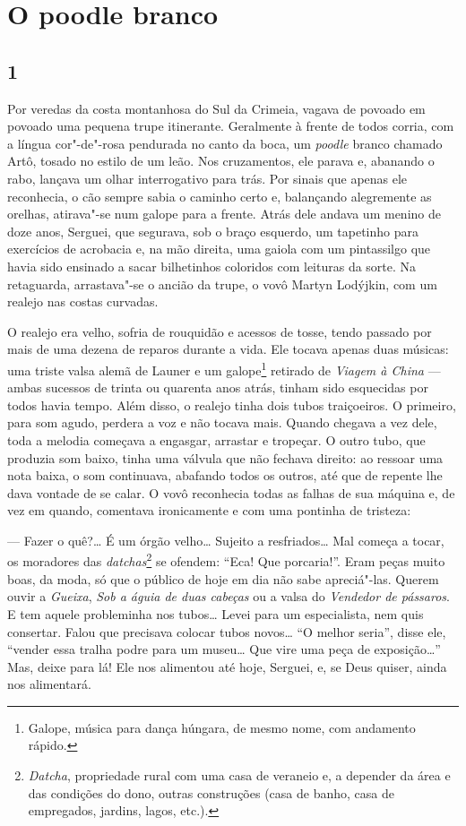 \chapter{O poodle branco} \label{part10}


\section{1}

\noindent{}Por veredas da costa montanhosa do Sul da Crimeia, vagava de povoado em
povoado uma pequena trupe itinerante. Geralmente à frente de todos
corria, com a língua cor"-de"-rosa pendurada no canto da boca, um
\emph{poodle} branco chamado Artô, tosado no estilo de um leão. Nos
cruzamentos, ele parava e, abanando o rabo, lançava um olhar
interrogativo para trás. Por sinais que apenas ele reconhecia, o cão
sempre sabia o caminho certo e, balançando alegremente as orelhas,
atirava"-se num galope para a frente. Atrás dele andava um menino de doze
anos, Serguei, que segurava, sob o braço esquerdo, um tapetinho para
exercícios de acrobacia e, na mão direita, uma gaiola com um pintassilgo
que havia sido ensinado a sacar bilhetinhos coloridos com leituras da
sorte. Na retaguarda, arrastava"-se o ancião da trupe, o vovô Martyn
Lodýjkin, com um realejo nas costas curvadas.

O realejo era velho, sofria de rouquidão e acessos de tosse, tendo
passado por mais de uma dezena de reparos durante a vida. Ele tocava
apenas duas músicas: uma triste valsa alemã de Launer e um
galope\footnote{Galope, música para dança húngara, de mesmo nome, com
  andamento rápido.} retirado de \emph{Viagem à China} --- ambas
sucessos de trinta ou quarenta anos atrás, tinham sido esquecidas por
todos havia tempo. Além disso, o realejo tinha dois tubos traiçoeiros. O
primeiro, para som agudo, perdera a voz e não tocava mais. Quando
chegava a vez dele, toda a melodia começava a engasgar, arrastar e
tropeçar. O outro tubo, que produzia som baixo, tinha uma válvula que
não fechava direito: ao ressoar uma nota baixa, o som continuava,
abafando todos os outros, até que de repente lhe dava vontade de se
calar. O vovô reconhecia todas as falhas de sua máquina e, de vez em
quando, comentava ironicamente e com uma pontinha de tristeza:

--- Fazer o quê?\ldots{} É um órgão velho\ldots{} Sujeito a resfriados\ldots{} Mal
começa a tocar, os moradores das \emph{datchas}\footnote{\emph{Datcha},
  propriedade rural com uma casa de veraneio e, a depender da área e das
  condições do dono, outras construções (casa de banho, casa de
  empregados, jardins, lagos, etc.).} se ofendem: ``Eca! Que
porcaria!''. Eram peças muito boas, da moda, só que o público de hoje em
dia não sabe apreciá"-las. Querem ouvir a \emph{Gueixa}, \emph{Sob a
águia de duas cabeças} ou a valsa do \emph{Vendedor de pássaros}. E tem
aquele probleminha nos tubos\ldots{} Levei para um especialista, nem quis
consertar. Falou que precisava colocar tubos novos\ldots{} ``O melhor seria'',
disse ele, ``vender essa tralha podre para um museu\ldots{} Que vire uma peça
de exposição\ldots{}'' Mas, deixe para lá! Ele nos alimentou até hoje,
Serguei, e, se Deus quiser, ainda nos alimentará.

